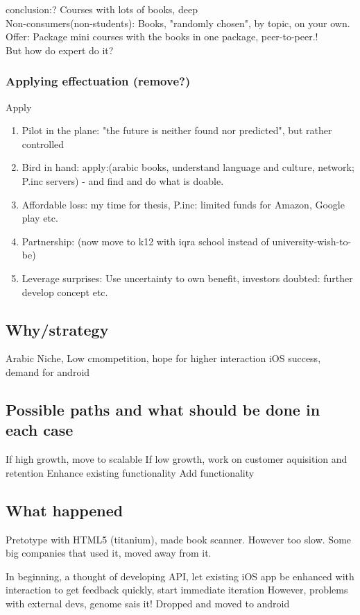 \documentclass[a4paper,10pt]{article}
\begin{document}
conclusion:?
Courses with lots of books, deep\\
Non-consumers(non-students): Books, "randomly chosen", by topic, on your own.\\
Offer: Package mini courses with the books in one package, peer-to-peer.!
\\
But how do expert do it?


\subsubsection{Applying effectuation (remove?)}
Apply
\begin{enumerate}
 \item Pilot in the plane: "the future is neither found nor predicted", but rather controlled 
 \item Bird in hand: apply:(arabic books, understand language and culture, network; P.inc servers) - and find and do what is doable.
 \item Affordable loss: my time for thesis, P.inc: limited funds for Amazon, Google play etc. 
 \item Partnership: (now move to k12 with iqra school instead of university-wish-to-be)
 \item Leverage surprises: Use uncertainty to own benefit, investors doubted: further develop concept etc.
\end{enumerate}

\subsection{Why/strategy}

 Arabic Niche, Low cmompetition, hope for higher interaction
 iOS success, demand for android

\subsection{Possible paths and what should be done in each case}
If high growth, move to scalable
If low growth, work on customer aquisition and retention
Enhance existing functionality
Add functionality 

\subsection{What happened}
Pretotype with HTML5 (titanium), made book scanner. However too slow.
Some big companies that used it, moved away from it.


In beginning, a thought of developing API, let existing iOS app be enhanced with interaction to get feedback quickly, start immediate iteration
However, problems with external devs, genome sais it!
Dropped and moved to android
\end{document}

